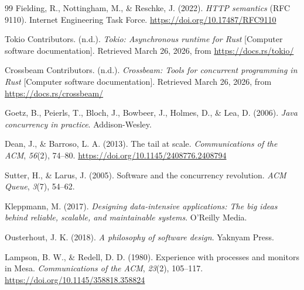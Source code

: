 \documentclass[11pt]{article}
\begin{document}
\begin{thebibliography}{99}
Fielding, R., Nottingham, M., \& Reschke, J. (2022). \emph{HTTP semantics} (RFC 9110). Internet Engineering Task Force. \url{https://doi.org/10.17487/RFC9110}

Tokio Contributors. (n.d.). \emph{Tokio: Asynchronous runtime for Rust} [Computer software documentation]. Retrieved March 26, 2026, from \url{https://docs.rs/tokio/}

Crossbeam Contributors. (n.d.). \emph{Crossbeam: Tools for concurrent programming in Rust} [Computer software documentation]. Retrieved March 26, 2026, from \url{https://docs.rs/crossbeam/}

Goetz, B., Peierls, T., Bloch, J., Bowbeer, J., Holmes, D., \& Lea, D. (2006). \emph{Java concurrency in practice}. Addison-Wesley.

Dean, J., \& Barroso, L. A. (2013). The tail at scale. \emph{Communications of the ACM}, \emph{56}(2), 74--80. \url{https://doi.org/10.1145/2408776.2408794}

Sutter, H., \& Larus, J. (2005). Software and the concurrency revolution. \emph{ACM Queue}, \emph{3}(7), 54--62.

Kleppmann, M. (2017). \emph{Designing data-intensive applications: The big ideas behind reliable, scalable, and maintainable systems}. O'Reilly Media.

Ousterhout, J. K. (2018). \emph{A philosophy of software design}. Yaknyam Press.

Lampson, B. W., \& Redell, D. D. (1980). Experience with processes and monitors in Mesa. \emph{Communications of the ACM}, \emph{23}(2), 105--117. \url{https://doi.org/10.1145/358818.358824}
\end{thebibliography}
\end{document}
